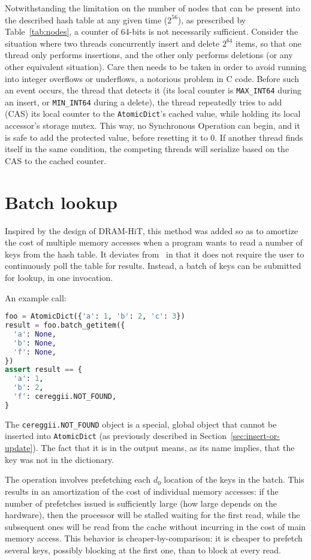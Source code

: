 Notwithstanding the limitation on the number of nodes that can be present into the described hash table at any given time ($2^{56}$), as prescribed by Table~\ref{tab:nodes}, a counter of 64-bits is not necessarily sufficient.
Consider the situation where two threads concurrently insert and delete $2^{64}$ items, so that one thread only performs insertions, and the other only performs deletions (or any other equivalent situation).
Care then needs to be taken in order to avoid running into integer overflows or underflows, a notorious problem in C code.
Before such an event occurs, the thread that detects it (its local counter is \texttt{MAX\_INT64} during an insert, or \texttt{MIN\_INT64} during a delete), the thread repeatedly tries to add (CAS) its local counter to the \texttt{AtomicDict}'s cached value, while holding its local accessor's storage mutex.
This way, no Synchronous Operation can begin, and it is safe to add the protected value, before resetting it to 0.
If another thread finds itself in the same condition, the competing threads will serialize based on the CAS to the cached counter.


\section{Batch lookup}\label{sec:batch-lookup}

Inspired by the design of DRAM-HiT, this method was added so as to amortize the cost of multiple memory accesses when a program wants to read a number of keys from the hash table.
It deviates from~\cite{dramhit} in that it does not require the user to continuously poll the table for results.
Instead, a batch of keys can be submitted for lookup, in one invocation.

An example call:

\begin{lstlisting}[language=Python,label={lst:batch-lookup-usage}]
foo = AtomicDict({'a': 1, 'b': 2, 'c': 3})
result = foo.batch_getitem({
  'a': None,
  'b': None,
  'f': None,
})
assert result == {
  'a': 1,
  'b': 2,
  'f': cereggii.NOT_FOUND,
}
\end{lstlisting}

The \texttt{cereggii.NOT\_FOUND} object is a special, global object that cannot be inserted into \texttt{AtomicDict} (as previously described in Section~\ref{sec:insert-or-update}).
The fact that it is in the output means, as its name implies, that the key was not in the dictionary.

The operation involves prefetching each $d_0$ location of the keys in the batch.
This results in an amortization of the cost of individual memory accesses: if the number of prefetches issued is sufficiently large (how large depends on the hardware), then the processor will be stalled waiting for the first read, while the subsequent ones will be read from the cache without incurring in the cost of main memory access.
This behavior is cheaper-by-comparison: it is cheaper to prefetch several keys, possibly blocking at the first one, than to block at every read.

